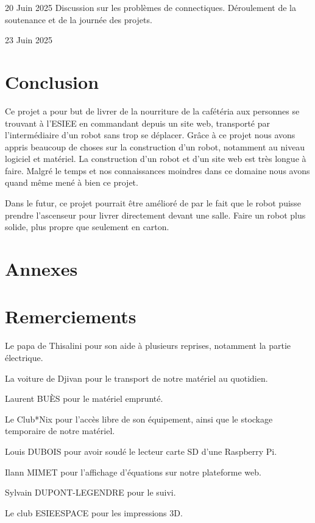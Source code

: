\documentclass[a4paper,12pt]{report}  %
\begin{document}
20 Juin 2025
Discussion sur les problèmes de connectiques.
Déroulement de la soutenance et de la journée des projets.


23 Juin 2025




\section{Conclusion}

Ce projet a pour but de livrer de la nourriture de la cafétéria aux personnes se trouvant à l’ESIEE en commandant depuis un site web, transporté par l’intermédiaire d’un robot sans trop se déplacer. Grâce à ce projet nous avons appris beaucoup de choses sur la construction d’un robot, notamment au niveau logiciel et matériel. La construction d’un robot et d’un site web est très longue à faire. Malgré le temps et nos connaissances moindres dans ce domaine nous avons quand même mené à bien ce projet.

Dans le futur, ce projet pourrait être amélioré de par le fait que le robot puisse prendre l’ascenseur pour livrer directement devant une salle. Faire un robot plus solide, plus propre que seulement en carton.


\section{Annexes}

\section{Remerciements}
Le papa de Thisalini pour son aide à plusieurs reprises, notamment la partie électrique.

La voiture de Djivan pour le transport de notre matériel au quotidien. 

Laurent BUÈS pour le matériel emprunté. 

Le Club*Nix pour l’accès libre de son équipement, ainsi que le stockage temporaire de notre matériel. 

Louis DUBOIS pour avoir soudé le lecteur carte SD d’une Raspberry Pi. 

Ilann MIMET pour l’affichage d’équations sur notre plateforme web. 

Sylvain DUPONT-LEGENDRE pour le suivi. 

Le club ESIEESPACE pour les impressions 3D. 
\end{document}
